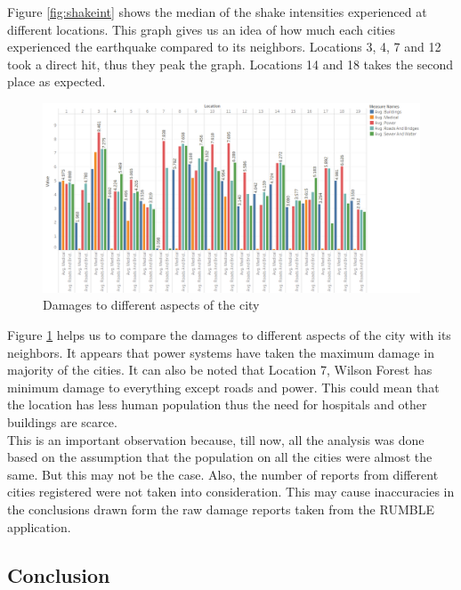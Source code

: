 \documentclass[12pt]{extarticle}
\begin{document}
Figure \ref{fig:shakeint} shows the median of the shake intensities experienced at different locations. This graph gives us an idea of how much each cities experienced the earthquake compared to its neighbors. Locations 3, 4, 7 and 12 took a direct hit, thus they peak the graph. Locations 14 and 18 takes the second place as expected. 

\begin{figure}[H]
\centering
	\includegraphics[width=\linewidth]{Images/AllSeperate.png}
	\caption{Damages to different aspects of the city}
	\label{fig:allseperate}
\end{figure}

Figure \ref{fig:allseperate} helps us to compare the damages to different aspects of the city with its neighbors.  It appears that power systems have taken the maximum damage in majority of the cities. It can also be noted that Location 7, Wilson Forest has minimum damage to everything except roads and power. This could mean that the location has less human population thus the need for hospitals and other buildings are scarce. \\

This is an important observation because, till now, all the analysis was done based on the assumption that the population on all the cities were almost the same. But this may not be the case. Also, the number of reports from different cities registered were not taken into consideration. This may cause inaccuracies in the conclusions drawn form the raw damage reports taken from the RUMBLE application. 

 \newpage
\begin{centering}
	\section{Conclusion}
\end{centering}
\end{document}
